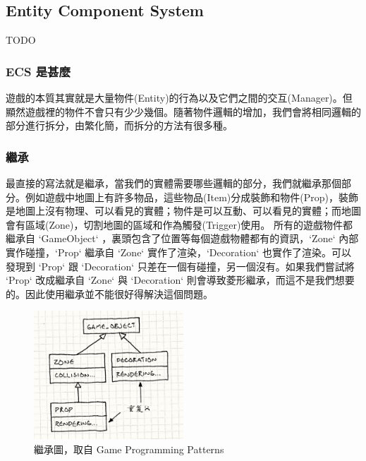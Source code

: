 \subsection{Entity Component System} %
\label{sub:Entity Component System}
TODO

\subsubsection{ECS 是甚麼}
遊戲的本質其實就是大量物件(Entity)的行為以及它們之間的交互(Manager)。但顯然遊戲裡的物件不會只有少少幾個。隨著物件邏輯的增加，我們會將相同邏輯的部分進行拆分，由繁化簡，而拆分的方法有很多種。

\subsubsection{繼承}

最直接的寫法就是繼承，當我們的實體需要哪些邏輯的部分，我們就繼承那個部分。例如遊戲中地圖上有許多物品，這些物品(Item)分成裝飾和物件(Prop)，裝飾是地圖上沒有物理、可以看見的實體；物件是可以互動、可以看見的實體；而地圖會有區域(Zone)，切割地圖的區域和作為觸發(Trigger)使用。
所有的遊戲物件都繼承自 `GameObject` ，裏頭包含了位置等每個遊戲物體都有的資訊，`Zone` 內部實作碰撞，`Prop` 繼承自 `Zone` 實作了渲染，`Decoration` 也實作了渲染。可以發現到 `Prop` 跟 `Decoration` 只差在一個有碰撞，另一個沒有。如果我們嘗試將 `Prop` 改成繼承自 `Zone` 與 `Decoration` 則會導致菱形繼承，而這不是我們想要的。因此使用繼承並不能很好得解決這個問題。

\begin{figure}[h]
    \begin{center}
        \includegraphics[width=0.5\textwidth]{./resources/ecs/inherit.png}
    \end{center}
\caption{繼承圖，取自 Game Programming Patterns}
\label{fig:inherit}
\end{figure}



